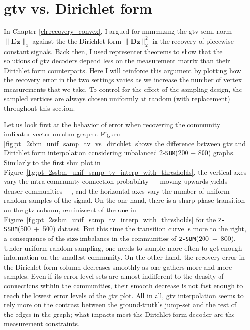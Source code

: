 \section{\texorpdfstring{\acrfull{gtv}}{Graph Total Variation} vs. Dirichlet form}

In Chapter \ref{ch:recovery_convex}, I argued for minimizing the \acrshort{gtv} semi-norm $\|\mathbf{Dz}\|_1$ against the the Dirichlet form $\| \mathbf{Dz} \|_2^2$ in the recovery of piecewise-constant signals. Back then, I used representer theorems to show that the solutions of \acrshort{gtv} decoders depend less on the measurement matrix than their Dirichlet form counterparts. Here I will reinforce this argument by plotting how the recovery error in the two settings varies as we increase the number of vertex measurements that we take. To control for the effect of the sampling design, the sampled vertices are always chosen uniformly at random (with replacement) throughout this section.

Let us look first at the behavior of error when recovering the community indicator vector on \acrshort{sbm} graphs. Figure \ref{fig:pt_2sbm_unif_samp_tv_vs_dirichlet} shows the difference between \acrshort{gtv} and Dirichlet form interpolation considering unbalanced 2-\texttt{SBM}(200 + 800) graphs. Similarly to the first \acrshort{sbm} plot in Figure~\ref{fig:pt_2ssbm_unif_samp_tv_interp_with_thresholds}, the vertical axes vary the intra-community connection probability --- moving upwards yields denser communities ---, and the horizontal axes vary the number of uniform random samples of the signal. On the one hand, there is a sharp phase transition on the \acrshort{gtv} column, reminiscent of the one in Figure~\ref{fig:pt_2ssbm_unif_samp_tv_interp_with_thresholds} for the \texttt{2-SSBM}(500~+~500) dataset. But this time the transition curve is more to the right, a consequence of the size imbalance in the communities of \texttt{2-SBM}(200~+~800). Under uniform random sampling, one needs to sample more often to get enough information on the smallest community. On the other hand, the recovery error in the Dirichlet form column decreases smoothly as one gathers more and more samples. Even if its error level-sets are almost indifferent to the density of connections within the communities, their smooth decrease is not fast enough to reach the lowest error levels of the \acrshort{gtv} plot. All in all, \acrshort{gtv} interpolation seems to rely more on the contrast between the ground-truth's jump-set and the rest of the edges in the graph; what impacts most the Dirichlet form decoder are the measurement constraints.

